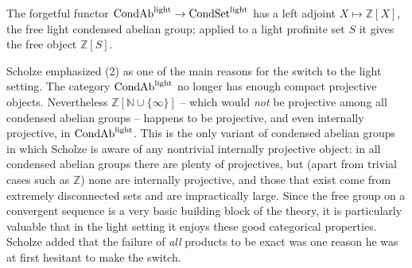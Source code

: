The forgetful functor $\mathrm{CondAb}^{\mathrm{light}}\to\mathrm{CondSet}^{\mathrm{light}}$ has a left adjoint $X\mapsto
\mathbb{Z}[X]$, the free light condensed abelian group; applied to a light
profinite set $S$ it gives the free object $\mathbb{Z}[S]$.

\begin{remark}
\label{rmk:2:internally-projective}
Scholze emphasized (2) as one of the main reasons
for the switch to the light setting. The category $\mathrm{CondAb}^{\mathrm{light}}$ no longer has enough
compact projective objects. Nevertheless $\mathbb{Z}[\mathbb{N}\cup\{\infty\}]$
-- which would \emph{not} be projective among all condensed abelian groups --
happens to be projective, and even internally projective, in $\mathrm{CondAb}^{\mathrm{light}}$. This is
the only variant of condensed abelian groups in which Scholze is aware of any
nontrivial internally projective object: in all condensed abelian groups there
are plenty of projectives, but (apart from trivial cases such as $\mathbb{Z}$)
none are internally projective, and those that exist come from extremely
disconnected sets and are impractically large. Since the free group on a
convergent sequence is a very basic building block of the theory, it is
particularly valuable that in the light setting it enjoys these good categorical
properties. Scholze added that the failure of \emph{all} products to be exact was
one reason he was at first hesitant to make the switch.
\end{remark}
